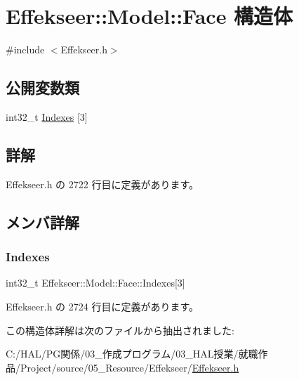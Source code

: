 \hypertarget{struct_effekseer_1_1_model_1_1_face}{}\section{Effekseer\+:\+:Model\+:\+:Face 構造体}
\label{struct_effekseer_1_1_model_1_1_face}


{\ttfamily \#include $<$Effekseer.\+h$>$}

\subsection*{公開変数類}
\begin{DoxyCompactItemize}
\item 
int32\+\_\+t \mbox{\hyperlink{struct_effekseer_1_1_model_1_1_face_aead573cd4f9b93d98f7181222eb5433c}{Indexes}} \mbox{[}3\mbox{]}
\end{DoxyCompactItemize}


\subsection{詳解}


 Effekseer.\+h の 2722 行目に定義があります。



\subsection{メンバ詳解}
\mbox{\label{struct_effekseer_1_1_model_1_1_face_aead573cd4f9b93d98f7181222eb5433c}} 
\subsubsection{\texorpdfstring{Indexes}{Indexes}}
{\footnotesize\ttfamily int32\+\_\+t Effekseer\+::\+Model\+::\+Face\+::\+Indexes\mbox{[}3\mbox{]}}



 Effekseer.\+h の 2724 行目に定義があります。



この構造体詳解は次のファイルから抽出されました\+:\begin{DoxyCompactItemize}
\item 
C\+:/\+H\+A\+L/\+P\+G関係/03\+\_\+作成プログラム/03\+\_\+\+H\+A\+L授業/就職作品/\+Project/source/05\+\_\+\+Resource/\+Effekseer/\mbox{\hyperlink{_effekseer_8h}{Effekseer.\+h}}\end{DoxyCompactItemize}
